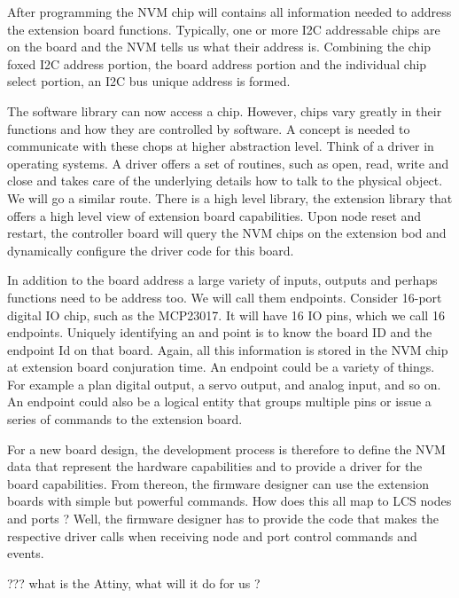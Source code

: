 After programming the NVM chip will contains all information needed to address the extension board functions. Typically, one or more I2C addressable chips are on the board and the NVM tells us what their address is. Combining the chip foxed I2C address portion, the board address portion and the individual chip select portion, an I2C bus unique address is formed. 

The software library can now access a chip. However, chips vary greatly in their functions and how they are controlled by software. A concept is needed to communicate with these chops at  higher abstraction level. Think of a driver in operating systems. A driver offers a set of routines, such as open, read, write and close and takes care of the underlying details how to talk to the physical object. We will go a similar route. There is a high level library, the extension library that offers a high level view of extension board capabilities. Upon node reset and restart, the controller board will query the NVM chips on the extension bod and dynamically configure the driver code for this board.

In addition to the board address a large variety of inputs, outputs and perhaps functions need to be address too. We will call them endpoints. Consider  16-port digital IO chip, such as the MCP23017. It will have 16 IO pins, which we call 16 endpoints. Uniquely identifying an and point is to know the board ID and the endpoint Id on that board. Again, all this information is stored in the NVM  chip at extension board conjuration time. An endpoint could be a variety of things. For example a plan digital output, a servo output, and analog input, and so on. An endpoint could also be a logical entity that groups multiple pins or issue a series of commands to the extension board.

For a new board design, the development process is therefore to define the NVM data that represent the hardware capabilities  and to provide a driver for the board capabilities. From thereon, the firmware designer can use the extension boards with simple but powerful commands. How does this all map to LCS nodes and ports ? Well, the firmware designer has to provide the code that makes the respective driver calls when receiving node and port control commands and events.


??? what is the Attiny, what will it do for us ?


